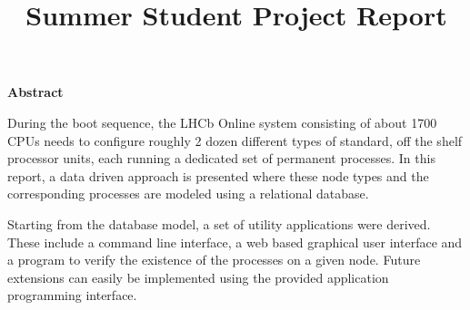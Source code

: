 \documentclass{customization}
\title{Summer Student Project Report}
\begin{document}





\fairemarges
\fairepagedegarde

\begin{Large}
\centerline{\textbf{Abstract}}
\end{Large}
\vspace{0.5cm}



During the boot sequence, the LHCb Online system consisting of about 1700 CPUs needs to configure roughly 2 dozen different types of standard, off the shelf processor units, each running a dedicated set of permanent processes. In this report, a data driven approach is presented where these node types and the corresponding processes are modeled using a relational database.
\newline

\noindent
Starting from the database model, a set of utility applications were derived. These include a command line interface, a web based graphical user interface and a program to verify the existence of the processes on a given node. Future extensions can easily be implemented using the provided application programming interface.

\end{document}
